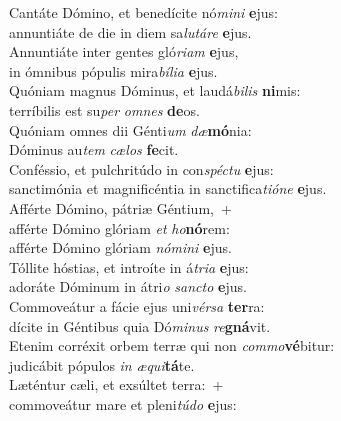 \evenverse Cantáte Dómino, et benedícite nó\textit{mi}\textit{ni} \textbf{e}jus:~\*\\
\evenverse annuntiáte de die in diem sa\textit{lu}\textit{tá}\textit{re} \textbf{e}jus.\\
\oddverse Annuntiáte inter gentes gló\textit{ri}\textit{am} \textbf{e}jus,~\*\\
\oddverse in ómnibus pópulis mira\textit{bí}\textit{li}\textit{a} \textbf{e}jus.\\
\evenverse Quóniam magnus Dóminus, et laudá\textit{bi}\textit{lis} \textbf{ni}mis:~\*\\
\evenverse terríbilis est su\textit{per} \textit{om}\textit{nes} \textbf{de}os.\\
\oddverse Quóniam omnes dii Génti\textit{um} \textit{dæ}\textbf{mó}nia:~\*\\
\oddverse Dóminus au\textit{tem} \textit{cæ}\textit{los} \textbf{fe}cit.\\
\evenverse Conféssio, et pulchritúdo in con\textit{spé}\textit{ctu} \textbf{e}jus:~\*\\
\evenverse sanctimónia et magnificéntia in sanctifica\textit{ti}\textit{ó}\textit{ne} \textbf{e}jus.\\
\oddverse Afférte Dómino, pátriæ Géntium,~+\\
\oddverse  afférte Dómino glóriam \textit{et} \textit{ho}\textbf{nó}rem:~\*\\
\oddverse afférte Dómino glóriam \textit{nó}\textit{mi}\textit{ni} \textbf{e}jus.\\
\evenverse Tóllite hóstias, et introíte in á\textit{tri}\textit{a} \textbf{e}jus:~\*\\
\evenverse adoráte Dóminum in átri\textit{o} \textit{san}\textit{cto} \textbf{e}jus.\\
\oddverse Commoveátur a fácie ejus uni\textit{vér}\textit{sa} \textbf{ter}ra:~\*\\
\oddverse dícite in Géntibus quia Dó\textit{mi}\textit{nus} \textit{re}\textbf{gná}vit.\\
\evenverse Etenim corréxit orbem terræ qui non \textit{com}\textit{mo}\textbf{vé}bitur:~\*\\
\evenverse judicábit pópulos \textit{in} \textit{æ}\textit{qui}\textbf{tá}te.\\
\oddverse Læténtur cæli, et exsúltet terra:~+\\
\oddverse  commoveátur mare et pleni\textit{tú}\textit{do} \textbf{e}jus:~\*\\

